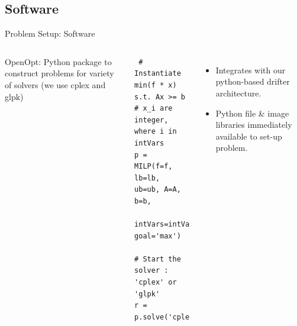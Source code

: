\documentclass[xcolor=pdflatex,dvipsnames,table]{beamer}
\begin{document}
\subsection{Software}
\begin{frame}[fragile]{Problem Setup: Software}
\begin{columns}
\small
OpenOpt: Python package to construct problems for variety of solvers (we use cplex and glpk)
{\footnotesize
\begin{verbatim} # Instantiate min(f * x) s.t. Ax >= b
# x_i are integer, where i in intVars
p = MILP(f=f, lb=lb, ub=ub, A=A, b=b,
    intVars=intVars, goal='max')

# Start the solver : 'cplex' or 'glpk'
r = p.solve('cplex') \end{verbatim}
}
\begin{itemize}
\item Integrates with our python-based drifter architecture.
\item Python file \& image libraries immediately available to set-up problem.
\end{itemize}


\end{columns}
\end{frame}
\end{document}
